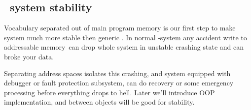 \subsection{\F\ system stability}

Vocabulary separated out of main program memory is our first step to make
system much more stable then generic \F. In normal \F-system any accident write
to addressable memory\ can drop whole system in unstable crashing state and can broke your data.

Separating address spaces isolates this crashing, and system equipped with
debugger or fault protection subsystem, can do recovery or some emergency
processing before everything drops to hell.
Later we'll introduce OOP implementation, and  between
objects will be good for stability.

